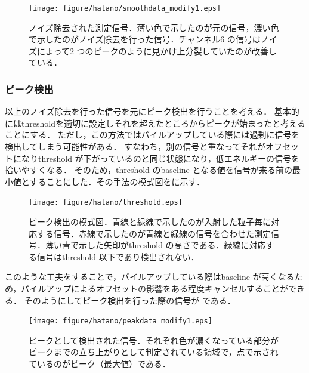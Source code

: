 \begin{figure}[hbt]
\centering
\texttt{[image: figure/hatano/smoothdata\_modify1.eps]}
\caption{ノイズ除去された測定信号．薄い色で示したのが元の信号，濃い色で示したのがノイズ除去を行った信号．チャンネル6 の信号はノイズによって2 つのピークのように見かけ上分裂していたのが改善している．}
\label{hatano_fig:smoothdata}
\end{figure}

\subsubsection{ピーク検出}
以上のノイズ除去を行った信号を元にピーク検出を行うことを考える．
基本的にはthresholdを適切に設定しそれを超えたところからピークが始まったと考えることにする．
ただし，この方法ではパイルアップしている際には過剰に信号を検出してしまう可能性がある．
すなわち，別の信号と重なってそれがオフセットになりthreshold が下がっているのと同じ状態になり，低エネルギーの信号を拾いやすくなる．
そのため，threshold のbaseline となる値を信号が来る前の最小値とすることにした．その手法の模式図をに示す．

\begin{figure}[hbt]
\centering
\texttt{[image: figure/hatano/threshold.eps]}
\caption{ピーク検出の模式図．青線と緑線で示したのが入射した粒子毎に対応する信号．赤線で示したのが青線と緑線の信号を合わせた測定信号．薄い青で示した矢印がthreshold の高さである．緑線に対応する信号はthreshold 以下であり検出されない．}
\label{hatano_fig:threshold}
\end{figure}

このような工夫をすることで，パイルアップしている際はbaseline が高くなるため，パイルアップによるオフセットの影響をある程度キャンセルすることができる．
そのようにしてピーク検出を行った際の信号が である．

\begin{figure}[hbt]
\centering
\texttt{[image: figure/hatano/peakdata\_modify1.eps]}
\caption{ピークとして検出された信号．それぞれ色が濃くなっている部分がピークまでの立ち上がりとして判定されている領域で，点で示されているのがピーク（最大値）である．}
\label{hatano_fig:peakdata}
\end{figure}

